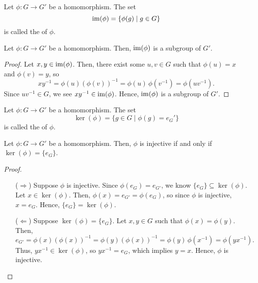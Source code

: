 \begin{defn}
Let $ \phi:G\to G' $ be a homomorphism. The set 
\begin{equation*}
    \operatorname{im}(\phi)=\{\phi(g)\mid g\in G\}
\end{equation*}
is called the  of $ \phi $.
\end{defn}

\begin{prop}
Let $ \phi:G\to G' $ be a homomorphism. Then, $ \operatorname{im}(\phi) $ is a subgroup of $ G' $.
\end{prop}
\begin{proof}
Let $ x,y\in\operatorname{im}(\phi) $. Then, there exist some $ u,v\in G $ such that $ \phi(u)=x $ and $ \phi(v)=y $, so
\begin{equation*}
    xy^{-1}=\phi(u)(\phi(v))^{-1}=\phi(u)\,\phi(v^{-1})=\phi(uv^{-1}).
\end{equation*}
Since $ uv^{-1}\in G $, we see $ xy^{-1}\in\operatorname{im}(\phi) $. Hence, $ \operatorname{im}(\phi) $ is a subgroup of $ G' $.
\end{proof}

\begin{defn}
Let $ \phi:G\to G' $ be a homomorphism. The set
\begin{equation*}
    \ker(\phi)=\{g\in G\mid\phi(g)=e_G'\}
\end{equation*}
is called the  of $ \phi $.
\end{defn}

\begin{thm}\label{thm:monomorphism}
Let $ \phi:G\to G' $ be a homomorphism. Then, $ \phi $ is injective if and only if $ \ker(\phi)=\{e_G\} $.
\end{thm}
\begin{proof}~
\begin{enumerate}
    \item[($ \Rightarrow $)] Suppose $ \phi $ is injective. Since $ \phi(e_G)=e_{G'} $, we know $ \{e_G\}\subseteq\ker(\phi) $. Let $ x\in\ker(\phi) $. Then, $ \phi(x)=e_{G'}=\phi(e_G) $, so since $ \phi $ is injective, $ x=e_G $. Hence, $ \{e_G\}=\ker(\phi) $.

    \item[($ \Leftarrow $)] Suppose $ \ker(\phi)=\{e_G\} $. Let $ x,y\in G $ such that $ \phi(x)=\phi(y) $. Then,
    \begin{equation*}
        e_{G'}=\phi(x)(\phi(x))^{-1}=\phi(y)(\phi(x))^{-1}=\phi(y)\,\phi(x^{-1})=\phi(yx^{-1}).
    \end{equation*}
    Thus, $ yx^{-1}\in\ker(\phi) $, so $ yx^{-1}=e_G $, which implies $ y=x $. Hence, $ \phi $ is injective.\qedhere
\end{enumerate}
\end{proof}

